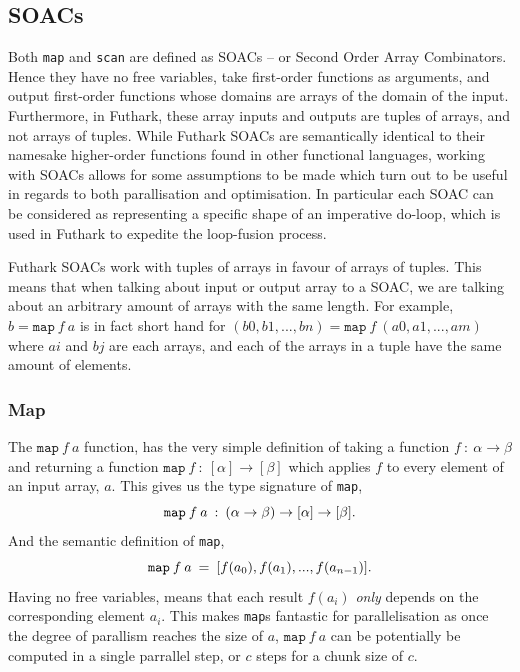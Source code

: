 \documentclass[11pt]{article}
\begin{document}
\subsection{SOACs}
Both \texttt{map} and \texttt{scan} are defined as SOACs -- or Second Order Array Combinators. Hence they have no free variables, take first-order functions as arguments, and output first-order
 functions whose domains are arrays of the domain of the input. Furthermore, in Futhark, these array inputs and outputs are tuples of arrays, and not arrays of tuples.
While Futhark SOACs are semantically identical to their namesake higher-order functions found in other functional languages, working with SOACs allows for some assumptions to be made
 which turn out to be useful in regards to both parallisation and optimisation. In particular each SOAC can be considered as representing a specific shape of an imperative do-loop, which
 is used in Futhark to expedite the loop-fusion process. \cite[chap. 7]{MasterTroels}

Futhark SOACs work with tuples of arrays in favour of arrays of tuples. This means that when talking about input or output array to a SOAC, we are talking about an arbitrary amount of arrays with
 the same length. For example, $b = \mathtt{map} \: f \: a$ is in fact short hand for $(b0, b1,..., bn) = \mathtt{map} \: f \: (a0, a1, ..., am)$ where $ai$ and $bj$ are each arrays, and each of the arrays
 in a tuple have the same amount of
 elements.
\subsubsection{Map}
The $\texttt{map} \: f \: a$ function, has the very simple definition of taking a function $f \: : \: \alpha \to \beta$ and returning a function $\mathtt{map} \:f \: : \: [\alpha] \to [\beta]$  which
 applies $f$ to every element of an input array, $a$.  This gives us the type signature of \texttt{map},
$$\mathtt{map} \: f \: a \: :  \: (\alpha \to \beta) \to [\alpha] \to [\beta]\mathnormal{.}$$
And the semantic definition of \texttt{map},
$$\mathtt{map} \: f \: a \: =  \: [f(a_0), f(a_1), ..., f(a_{n-1})]\mathnormal{.}$$
Having no free variables, means that each result $f(a_i)$ \textit{only} depends on the corresponding element $a_i$. This makes \texttt{map}s fantastic for parallelisation as once the
 degree of parallism reaches the size of $a$, $\mathtt{map} \: f \: a$ can be potentially be computed in a single parrallel step, or $c$ steps for a chunk size of $c$.
\end{document}
